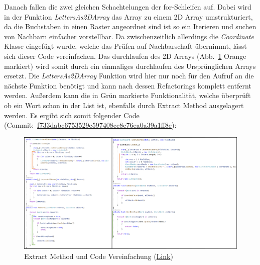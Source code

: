 Danach fallen die zwei gleichen Schachtelungen der for-Schleifen auf. Dabei wird in der Funktion \textit{LettersAs2DArray} das Array zu einem 2D Array umstrukturiert, da die Buchstaben in einen Raster angeordnet sind ist so ein Iterieren und suchen von Nachbarn einfacher vorstellbar. Da zwischenzeitlich allerdings die \textit{Coordinate} Klasse eingefügt wurde, welche das Prüfen auf Nachbarschaft übernimmt, lässt sich dieser Code vereinfachen. Das durchlaufen des 2D Arrays (Abb.~\ref{Abb:CodeVereinfachen} Orange markiert) wird somit durch ein einmaliges durchlaufen des Ursprünglichen Arrays ersetzt. Die \textit{LettersAs2DArray} Funktion wird hier nur noch für den Aufruf an die nächste Funktion benötigt und kann nach dessen Refactorings komplett entfernt werden. Außerdem kann die in Grün markierte Funktionalität, welche überprüft ob ein Wort schon in der List ist, ebenfalls durch Extract Method ausgelagert werden. Es ergibt sich somit folgender Code (Commit:~\href{https://github.com/EinToni/Wortfinder/commit/f733dabc6753529e597408cc8c76ea0a39a1ff8e}{f733dabc6753529e597408cc8c76ea0a39a1ff8e}):

\begin{figure}[!ht]
  \centering
  \includegraphics[width=\textwidth]{Bilder/CodeVereinfachen.PNG}
  \caption[Extract Method und Code Vereinfachung]{Extract Method und Code Vereinfachung (\href{https://github.com/EinToni/WortfinderDoku/blob/main/Bilder/CodeVereinfachen.png}{Link})}
  \label{Abb:CodeVereinfachen}
\end{figure}

